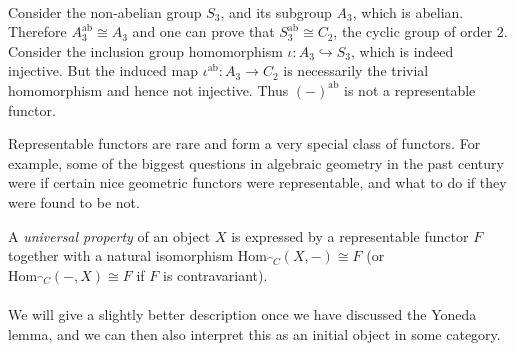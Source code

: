 \begin{example}
\begin{itemize}[itemsep=1.5em]
\\
Consider the non-abelian group $S_3$, and its subgroup $A_3$, which is abelian. Therefore $A_3^{\text{ab}} \cong A_3$ and one can prove that $S_3^{\text{ab}} \cong C_2$, the cyclic group of order $2$. Consider the inclusion group homomorphism $\iota: A_3 \hookrightarrow S_3$, which is indeed injective. But the induced map $\iota^{\text{ab}}: A_3 \to C_2$ is necessarily the trivial homomorphism and hence not injective. Thus $(-)^{\text{ab}}$ is not a representable functor.
\end{itemize}
\end{example}

\vspace*{0.1in}

\begin{remark}
Representable functors are rare and form a very special class of functors. For example, some of the biggest questions in algebraic geometry in the past century were if certain nice geometric functors were representable, and what to do if they were found to be not.
\end{remark}

\vspace*{0.1in}

\begin{definition}
A \emph{universal property} of an object $X$ is expressed by a representable functor $F$ together with a natural isomorphism $\mathrm{Hom}_{\cat{C}}(X,-)\cong F$ (or $\mathrm{Hom}_{\cat{C}}(-,X)\cong F$ if $F$ is contravariant).\\
\\
We will give a slightly better description once we have discussed the Yoneda lemma, and we can then also interpret this as an initial object in some category.
\end{definition}

\vspace*{0.1in}

